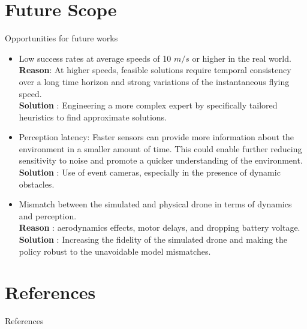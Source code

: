 \documentclass{beamer}
\begin{document}
\section{Future Scope}
\begin{frame}[allowframebreaks]{Opportunities for future works}
	\begin{itemize}
		\item Low success rates at average speeds of 10 $m/s$ or higher in the real world. \\
		\textbf{Reason}: At higher speeds, feasible solutions require temporal consistency over a long time horizon and strong variations of the instantaneous flying speed.\\
		\textbf{Solution} : Engineering a more complex expert by specifically tailored heuristics to find approximate solutions. 
		
		\item Perception latency: Faster sensors can provide more information about the environment in a smaller amount of time. This could enable further reducing sensitivity to noise and promote a quicker understanding of the environment. 
		\textbf{Solution} : Use of event cameras, especially in the presence of dynamic obstacles.
		
		\item Mismatch between the simulated and physical drone in terms of dynamics and perception. \\
		\textbf{Reason} : aerodynamics effects, motor delays, and dropping battery voltage. \\
		\textbf{Solution} : Increasing the fidelity of the simulated drone and making the policy robust to the unavoidable model mismatches.
		
		
	\end{itemize}
	
\end{frame}

\section{References}
\begin{frame}[allowframebreaks]{References}
	\printbibliography
\end{frame}
\end{document}
